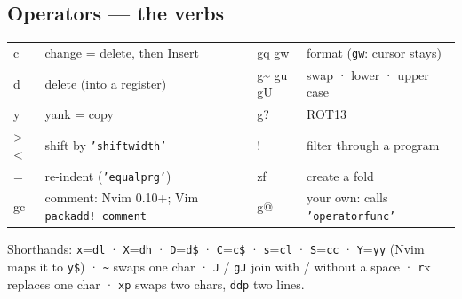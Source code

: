 \documentclass[8pt]{extarticle}
\newcommand\ct[1]{\texttt{#1}}
\newcommand\tl{\textasciitilde}
\begin{document}
\begin{multicols}{2}
\raggedright
\footnotesize{}

\section{Operators — the verbs}
{\scriptsize\setlength{\tabcolsep}{2pt}
\begin{tabular}{@{}T{8mm}L{28mm}T{10mm}L{29mm}@{}}
\toprule
c & change = delete, then Insert & gq gw & format (\texttt{gw}: cursor stays)\\
d & delete (into a register) & g\tl{} gu gU & swap · lower · upper case\\
y & yank = copy & g? & ROT13\\
> < & shift by \texttt{'shiftwidth'} & ! & filter through a program\\
= & re-indent (\texttt{'equalprg'}) & zf & create a fold\\
gc & comment: Nvim 0.10+; Vim \texttt{packadd!~comment} & g@ & your own: calls \texttt{'operatorfunc'}\\
\bottomrule
\end{tabular}}\par
Shorthands: \ct{x}=\ct{dl} · \ct{X}=\ct{dh} · \ct{D}=\ct{d\$} · \ct{C}=\ct{c\$} · \ct{s}=\ct{cl}
· \ct{S}=\ct{cc} · \ct{Y}=\ct{yy} (Nvim maps it to \ct{y\$}) · \ct{\tl} swaps one char · \ct{J} /
\ct{gJ} join with / without a space · \ct{r}x replaces one char · \ct{xp} swaps two chars,
\ct{ddp} two lines.


\end{multicols}
\end{document}

